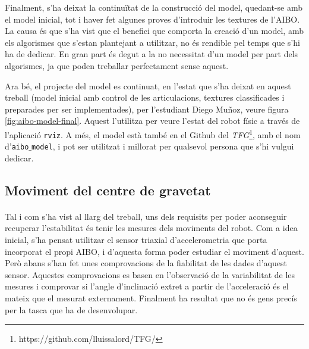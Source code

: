 \documentclass[12pt,a4paper,final,twoside]{article}
\begin{document}

Finalment, s'ha deixat la continuïtat de la construcció del model, quedant-se amb el model inicial, tot i haver fet algunes proves d'introduir les textures de l'AIBO. La causa és que s'ha vist que el benefici que comporta la creació d'un model, amb els algorismes que s'estan plantejant a utilitzar, no és rendible pel temps que s'hi ha de dedicar. En gran part és degut a la no necessitat d'un model per part dels algorismes, ja que poden treballar perfectament sense aquest.

Ara bé, el projecte del model es continuat, en l'estat que s'ha deixat en aquest treball (model inicial amb control de les articulacions, textures classificades i preparades per ser implementades), per l'estudiant Diego Muñoz, veure figura \ref{fig:aibo-model-final}. Aquest l'utilitza per veure l'estat del robot físic a través de l'aplicació \texttt{rviz}. A més, el model està també en el Github del \textit{TFG}\footnote{https://github.com/lluissalord/TFG/}, amb el nom d'\texttt{aibo$\_$model}, i pot ser utilitzat i millorat per qualsevol persona que s'hi vulgui dedicar.


\subsection{Moviment del centre de gravetat}



\paragraph{}Tal i com s'ha vist al llarg del treball, uns dels requisits per poder aconseguir recuperar l'estabilitat és tenir les mesures dels moviments del robot. Com a idea inicial, s'ha pensat utilitzar el sensor triaxial d'accelerometria que porta incorporat el propi AIBO, i d'aquesta forma poder estudiar el moviment d'aquest. Però abans s'han fet unes comprovacions de la fiabilitat de les dades d'aquest sensor. Aquestes comprovacions es basen en l'observació de la variabilitat de les mesures i comprovar si l'angle d'inclinació extret a partir de l'acceleració és el mateix que el mesurat externament. Finalment ha resultat que no és gens precís per la tasca que ha de desenvolupar.
\end{document}
